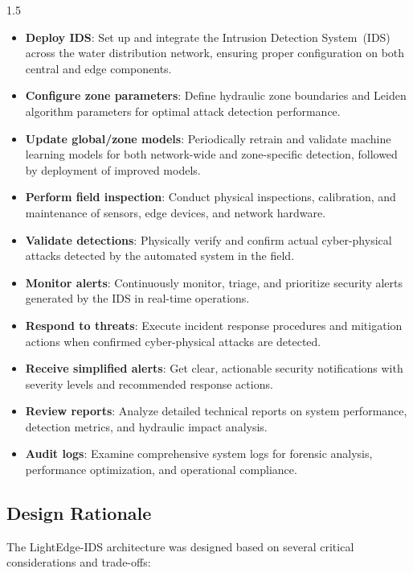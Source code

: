 \begin{spacing}{1.5}
\begin{itemize}
\item \textbf{Deploy IDS}: Set up and integrate the Intrusion Detection System~(IDS) across the water distribution network, ensuring proper configuration on both central and edge components.
\item \textbf{Configure zone parameters}: Define hydraulic zone boundaries and Leiden algorithm parameters for optimal attack detection performance.
\item \textbf{Update global/zone models}: 
Periodically retrain and validate machine learning models for both network-wide and zone-specific detection, followed by deployment of improved models.
\item \textbf{Perform field inspection}: Conduct physical inspections, calibration, and maintenance of sensors, edge devices, and network hardware.
\item \textbf{Validate detections}: Physically verify and confirm actual cyber-physical attacks detected by the automated system in the field.
\item \textbf{Monitor alerts}: Continuously monitor, triage, and prioritize security alerts generated by the IDS in real-time operations.
\item \textbf{Respond to threats}: Execute incident response procedures and mitigation actions when confirmed cyber-physical attacks are detected.
\item \textbf{Receive simplified alerts}: Get clear, actionable security notifications with severity levels and recommended response actions.
\item \textbf{Review reports}: Analyze detailed technical reports on system performance, detection metrics, and hydraulic impact analysis.
\item \textbf{Audit logs}: Examine comprehensive system logs for forensic analysis, performance optimization, and operational compliance.

\end{itemize}




\subsection{Design Rationale}

The LightEdge-IDS architecture was designed based on several critical considerations and trade-offs:


\end{spacing}
